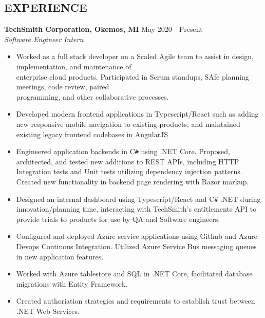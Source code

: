 \documentclass[overlapped]{res}
\begin{document}
\begin{resume}
    \section{EXPERIENCE}
    \textbf{TechSmith Corporation, Okemos, MI}
    \hfill May 2020 - Present \\
    {\sl Software Engineer Intern}
    \begin{itemize}  \itemsep -2pt %
        \item Worked as a full stack developer on a Scaled Agile team to assist in design, implementation, and maintenance of \\
        enterprise cloud products. Participated in Scrum standups, SAfe planning meetings, code review, paired \\
        programming, and other collaborative processes.
        \item Developed modern frontend applications in Typescript/React such as adding new responsive mobile navigation to existing products, and maintained existing legacy frontend codebases in AngularJS
        \item Engineered application backends in C\texttt{\#} using .NET Core. Proposed, architected, and tested new additions to REST APIs, 
        including HTTP Integration tests and Unit tests utilizing dependency injection patterns. 
        Created new functionality in backend page rendering with Razor markup.
        \item Designed an internal dashboard using Typescript/React and C\texttt{\#} .NET during innovation/planning time, 
        interacting with TechSmith's entitlements API to provide trials to products for use by QA and Software engineers.
        \item Configured and deployed Azure service applications using Github and Azure Devops Continous Integration. Utilized Azure Service Bus messaging queues in new application features.
        \item Worked with Azure tablestore and SQL in .NET Core, facilitated database migrations with Entity Framework. 
        \item Created authoriation strategies and requirements to establish trust between .NET Web Services.
    \end{itemize}


\end{resume}
\end{document}
